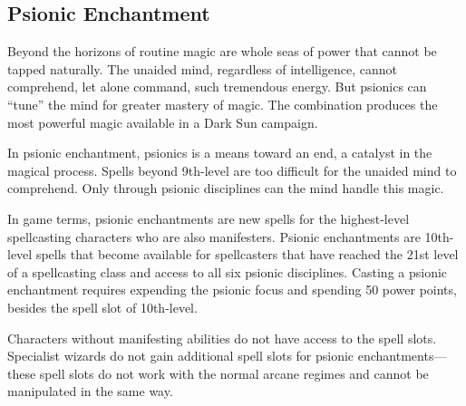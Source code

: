 \subsection{Psionic Enchantment}
Beyond the horizons of routine magic are whole seas of power that cannot be tapped naturally. The unaided mind, regardless of intelligence, cannot comprehend, let alone command, such tremendous energy. But psionics can ``tune'' the mind for greater mastery of magic. The combination produces the most powerful magic available in a {\tableheader Dark Sun} campaign.

In psionic enchantment, psionics is a means toward an end, a catalyst in the magical process. Spells beyond 9th-level are too difficult for the unaided mind to comprehend. Only through psionic disciplines can the mind handle this magic.

In game terms, psionic enchantments are new spells for the highest-level spellcasting characters who are also manifesters. Psionic enchantments are 10th-level spells that become available for spellcasters that have reached the 21st level of a spellcasting class and access to all six psionic disciplines. Casting a psionic enchantment requires expending the psionic focus and spending 50 power points, besides the spell slot of 10th-level.

Characters without manifesting abilities do not have access to the spell slots. Specialist wizards do not gain additional spell slots for psionic enchantments---these spell slots do not work with the normal arcane regimes and cannot be manipulated in the same way.
